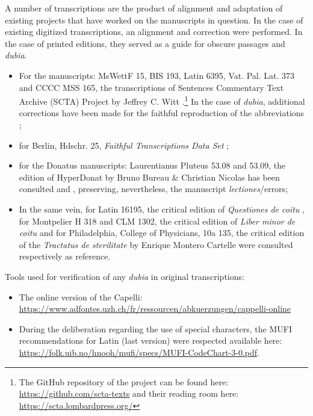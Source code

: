 \documentclass{article}
\begin{document}
A number of transcriptions are the product of alignment and adaptation of existing projects that have worked on the manuscripts in question. In the case of existing digitized transcriptions, an alignment and correction were performed. In the case of printed editions, they served as a guide for obscure passages and \textit{dubia}.
\begin{itemize}
    \item For the manuscripts: MsWettF 15, BIS 193, Latin 6395, Vat. Pal. Lat. 373  and CCCC MSS 165, the transcriptions of Sentences Commentary Text Archive (SCTA) Project by Jeffrey C. Witt \citep{witt2016digital}.\footnote{The GitHub repository of the project can be found here: \url{https://github.com/scta-texts} and their reading room here: \url{https://scta.lombardpress.org/}} In the case of \textit{dubia}, additional corrections have been made for the faithful reproduction of the abbreviations ;
    \item for Berlin, Hdschr. 25, \textit{Faithful Transcriptions Data Set}  \citep{eichenberger_nicole_2021_5582483};
    \item for the Donatus manuscripts: Laurentianus Pluteus 53.08 and 53.09, the edition of HyperDonat by Bruno Bureau \& Christian Nicolas has been consulted \citep{bureau2008hyperdonat} and \citep{pinche2016hyperdonat}, preserving, nevertheless, the manuscript \textit{lectiones}/errors;
    \item In the same vein, for Latin 16195, the critical edition of \textit{Questiones de coitu} \citep{cartelle2017questiones}, for  Montpelier H 318 and CLM 1302, the critical edition of \textit{Liber minor de coitu} \citep{cartelle1987liberminor} and for Philadelphia, College of Physicians, 10a 135, the critical edition of the \textit{Tractatus de sterilitate} \citep{cartelle1993tractatus} by Enrique Montero Cartelle were consulted respectively as reference.
\end{itemize}


Tools used for verification of any \textit{dubia} in original transcriptions:
\begin{itemize}
    \item The online version of the Capelli: \url{https://www.adfontes.uzh.ch/fr/ressourcen/abkuerzungen/cappelli-online}
    \item During the deliberation regarding the use of special characters, the MUFI recommendations for Latin (last version) were respected \citep{wills2016medieval} available here: \url{https://folk.uib.no/hnooh/mufi/specs/MUFI-CodeChart-3-0.pdf}.
\end{itemize}
\end{document}
